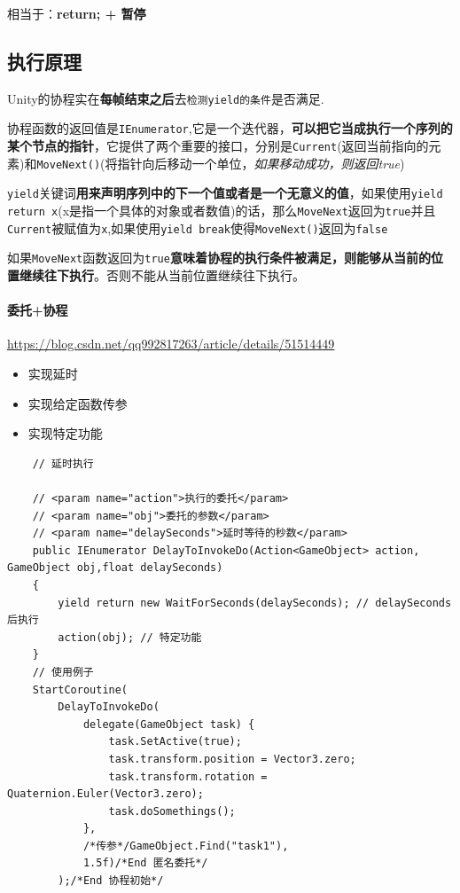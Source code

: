 \documentclass[UTF8,a4paper,12pt]{ctexbook}
\begin{document}
				\color{blue}相当于：\textbf{return; + 暂停}\color{black}
				
		\subsection{执行原理}
			Unity的协程实在\textbf{每帧结束之后}去\verb|检测yield的条件|是否满足.
		
			协程函数的返回值是\verb|IEnumerator|,它是一个迭代器，\textbf{可以把它当成执行一个序列的某个节点的指针}，它提供了两个重要的接口，分别是\verb|Current|(返回当前指向的元素)和\verb|MoveNext()|(将指针向后移动一个单位，\textit{如果移动成功，则返回true})
			
			\verb|yield|关键词\textbf{用来声明序列中的下一个值或者是一个无意义的值}，如果使用\verb|yield return x|(x是指一个具体的对象或者数值)的话，那么\verb|MoveNext|返回为\verb|true|并且\verb|Current|被赋值为\verb|x|,如果使用\verb|yield break|使得\verb|MoveNext()|返回为\verb|false|
			
			如果\verb|MoveNext|函数返回为\verb|true|\textbf{意味着协程的执行条件被满足，则能够从当前的位置继续往下执行}。否则不能从当前位置继续往下执行。	

	\paragraph{委托+协程}
		\url{https://blog.csdn.net/qq992817263/article/details/51514449}
		
		\begin{itemize}
			\item 实现延时
			\item 实现给定函数传参
			\item 实现特定功能
		\end{itemize}
	
		\begin{lstlisting}
	// 延时执行

	// <param name="action">执行的委托</param>
	// <param name="obj">委托的参数</param>
	// <param name="delaySeconds">延时等待的秒数</param>
	public IEnumerator DelayToInvokeDo(Action<GameObject> action, GameObject obj,float delaySeconds)
	{
		yield return new WaitForSeconds(delaySeconds); // delaySeconds 后执行
		action(obj); // 特定功能
	}
	// 使用例子
	StartCoroutine(
		DelayToInvokeDo(
			delegate(GameObject task) {
				task.SetActive(true);
				task.transform.position = Vector3.zero;
				task.transform.rotation = Quaternion.Euler(Vector3.zero);
				task.doSomethings();
			},
			/*传参*/GameObject.Find("task1"),
			1.5f)/*End 匿名委托*/
		);/*End 协程初始*/
		\end{lstlisting}
		
\end{document}

